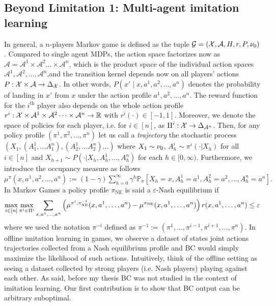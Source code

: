 \documentclass{article}
\def\gA{{\mathcal{A}}}
\def\gG{{\mathcal{G}}}
\begin{document}
\subsection{Beyond Limitation 1: Multi-agent imitation learning}
In general, a $n$-players Markov game is defined as the tuple $\gG = (\cX, \cA, H, r, P, \initial)$. Compared to single agent MDPs, the action space factorizes now as
$\gA = \gA^1 \times \gA^2 \dots \times \gA^n$, which is the product space of the individual action spaces 
$\gA^1,\gA^2, \dots, \gA^n$,and the transition kernel depends now on all players' actions  $P:\mathcal{X}\times\mathcal{A}\rightarrow \Delta_{\mathcal{X}}$. In other words, $P(x' \mid x,a^1,a^2, \dots, a^n)$ denotes the probability of landing in $x'$ from $x$ under the action profile $a^1,a^2,\dots, a^n$. The reward function for the $i^{\mathrm{th}}$ player also depends on the whole action profile
 $r^i: \mathcal{X}\times\mathcal{A}^1\times\mathcal{A}^2 \dots \times \mathcal{A}^n \rightarrow \mathbb{R}$ with $r^i(\cdot) \in [-1,1].$ 
Moreover, we denote the  space of policies for each player, i.e.  for $i \in [n]$, as $\Pi^i: \mathcal{X} \rightarrow \Delta_{\mathcal{A}^n}$.
Then, for any policy profile $(\pi^1,\pi^2, \dots, \pi^n)$ let us call a \emph{trajectory} the stochastic process $(X_1, (A^1_1, \dots A^n_1),  (A^1_2, \dots A^n_2) \dots)$ where $X_1 \sim \nu_0$, $A^i_h \sim \pi^i(\cdot|X_h)$ for all $i \in [n]$ and $X_{h+1} \sim P(\cdot|X_h, A^1_h, \dots, A^n_h)$ for each $h \in [0, \infty )$.
Furthermore, we introduce the occupancy measure as follows
$\mu^{\pi}(x,a^1,a^2, \dots, a^n) := (1-\gamma)\sum^{\infty}_{h=0}\gamma^h\mathbb{P}_{\pi}[X_h = x, A^1_h = a^1, A^2_h = a^2,\dots, A^n_h = a^n ].$
In Markov Games a policy profile $\pi_{\mathrm{NE}}$ is said a $\varepsilon$-Nash equilibrium if $$ \max_{i\in[n]}\max_{\pi^i \in \Pi^i}\sum_{x,a^1, \dots,a^n} \left({\mu^{\pi^i, \pi^{-i}_{\mathrm{NE}}}(x,a^1, \dots,a^n) - \mu^{\pi_{\mathrm{NE}}}(x,a^1, \dots,a^n)}\right)r(x,a^1, \dots,a^n) \leq \varepsilon$$
where we used the notation $\pi^{-i}$ defined as $\pi^{-1} := (\pi^1, \dots, \pi^{i-1}, \pi^{i+1}, \dots, \pi^n)$. 
In offline imitation learning in games, we observe a dataset of states joint actions trajectories collected from a Nash equilibrium profile and BC would simply maximize the likelihood of such actions.
Intuitively, think of the offline setting as seeing a dataset collected by strong players (i.e. Nash players) playing against each other.
As said, before my thesis BC was not studied in the context of imitation learning. Our first contribution is to show that BC output can be arbitrary suboptimal.
\end{document}
